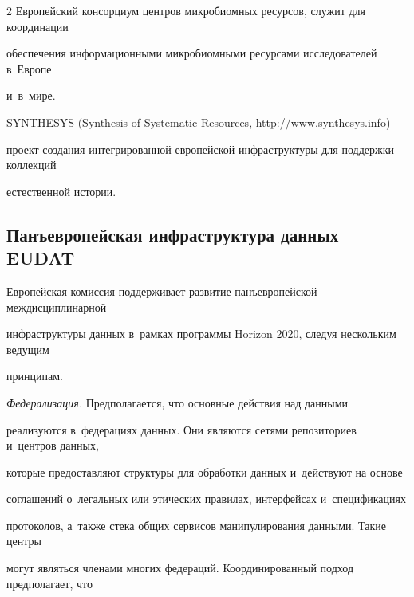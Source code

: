 \begin{multicols}{2}
Европейский консорциум центров микробиомных ресурсов, служит для координации 


обеспечения информацион\-ными микробиомными ресурсами исследователей в~Европе 


и~в~мире.


  


  SYNTHESYS (Synthesis of Systematic Resources, {\sf http://www.synthesys.info})~--- 


  проект  создания интегрированной европейской инфраструктуры для поддержки коллекций 


естественной истории.





\columnbreak





\subsection{Панъевропейская инфраструктура данных EUDAT}










  Европейская комиссия поддерживает развитие панъевропейской междисциплинарной 


инфраструктуры данных в~рамках программы Horizon 2020, следуя нескольким ведущим 


принципам. 







  


  \textit{Федерализация.} Предполагается, что основные действия над данными 


реализуются в~федерациях данных. Они являются сетями репозиториев и~центров данных, 


которые предоставляют структуры для обработки данных и~действуют на основе 


соглашений о~легальных или этических правилах, интерфейсах и~спецификациях 


протоколов, а~также стека общих сервисов манипулирования данными. Такие центры 


могут являться членами многих федераций. Координированный подход предполагает, что 



\end{multicols}
